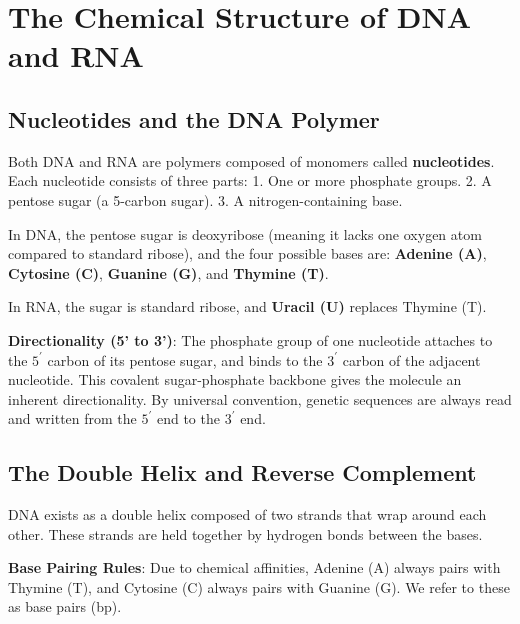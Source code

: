 
\section{The Chemical Structure of DNA and RNA}

\subsection{Nucleotides and the DNA Polymer}
Both DNA and RNA are polymers composed of monomers called \textbf{nucleotides}. Each nucleotide consists of three parts:
1. One or more phosphate groups.
2. A pentose sugar (a 5-carbon sugar).
3. A nitrogen-containing base.

In DNA, the pentose sugar is deoxyribose (meaning it lacks one oxygen atom compared to standard ribose), and the four possible bases are: \textbf{Adenine (A)}, \textbf{Cytosine (C)}, \textbf{Guanine (G)}, and \textbf{Thymine (T)}. 

In RNA, the sugar is standard ribose, and \textbf{Uracil (U)} replaces Thymine (T). 

\begin{important}
  \textbf{Directionality (5' to 3')}: The phosphate group of one nucleotide attaches to the $5^{\prime}$ carbon of its pentose sugar, and binds to the $3^{\prime}$ carbon of the adjacent nucleotide. This covalent sugar-phosphate backbone gives the molecule an inherent directionality. By universal convention, genetic sequences are always read and written from the $5^{\prime}$ end to the $3^{\prime}$ end.
\end{important}


\subsection{The Double Helix and Reverse Complement}
DNA exists as a double helix composed of two strands that wrap around each other. These strands are held together by hydrogen bonds between the bases. 

\begin{important}
  \textbf{Base Pairing Rules}: Due to chemical affinities, Adenine (A) always pairs with Thymine (T), and Cytosine (C) always pairs with Guanine (G). We refer to these as base pairs (bp).
\end{important}

